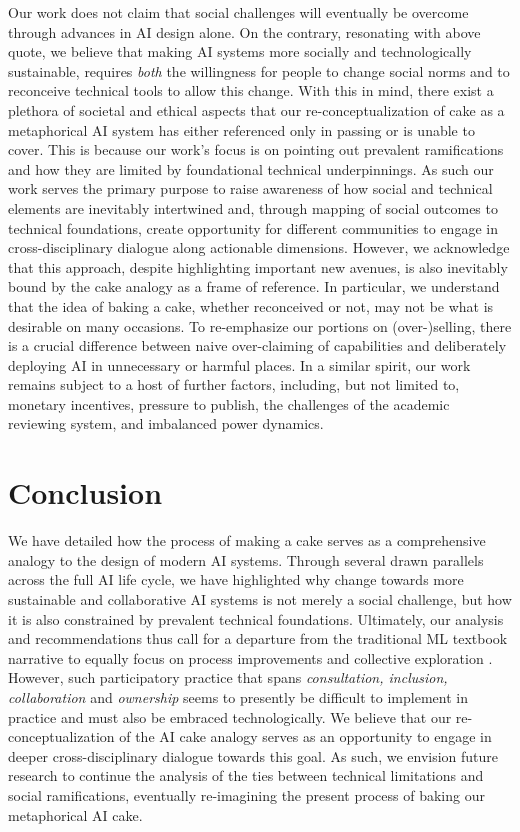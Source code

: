 \documentclass[manuscript,screen,authorversion,nonacm]{acmart}
\begin{document}
\noindent Our work does not claim that social challenges will eventually be overcome through advances in AI design alone. On the contrary, resonating with above quote, we believe that making AI systems more socially and technologically sustainable, requires \textit{both} the willingness for people to change social norms and to reconceive technical tools to allow this change. 
With this in mind, there exist a plethora of societal and ethical aspects that our re-conceptualization of cake as a metaphorical AI system has either referenced only in passing or is unable to cover. This is because our work's focus is on pointing out prevalent ramifications and how they are limited by foundational technical underpinnings. As such our work serves the primary purpose to raise awareness of how social and technical elements are inevitably intertwined and, through mapping of social outcomes to technical foundations, create opportunity for different communities to engage in cross-disciplinary dialogue along actionable dimensions. However, we acknowledge that this approach, despite highlighting important new avenues, is also inevitably bound by the cake analogy as a frame of reference. In particular, we understand that the idea of baking a cake, whether reconceived or not, may not be what is desirable on many occasions. To re-emphasize our portions on (over-)selling, there is a crucial difference between naive over-claiming of capabilities and deliberately deploying AI in unnecessary or harmful places.
In a similar spirit, our work remains subject to a host of further factors, including, but not limited to, monetary incentives, pressure to publish, the challenges of the academic reviewing system, and imbalanced power dynamics. 

\section{Conclusion}
We have detailed how the process of making a cake serves as a comprehensive analogy to the design of modern AI systems. Through several drawn parallels across the full AI life cycle, we have highlighted why change towards more sustainable and collaborative AI systems is not merely a social challenge, but how it is also constrained by prevalent technical foundations. Ultimately, our analysis and recommendations thus call for a departure from the traditional ML textbook narrative \cite{Bishop2006MLBook,Murphy2012ProbMLBook,Goodfellow2016DLBook} to equally focus on process improvements and collective exploration \cite{Birhane2022powertopeople}. However, such participatory practice \cite{Arnstein1969ladder} that spans \emph{consultation, inclusion, collaboration} and \emph{ownership} seems to presently be difficult to implement in practice \cite{Delgado2023participatoryturn, AdaLoveInst2021ParticipatoryDataSteward} and must also be embraced technologically. We believe that our re-conceptualization of the AI cake analogy serves as an opportunity to engage in deeper cross-disciplinary dialogue towards this goal. As such, we envision future research to continue the analysis of the ties between technical limitations and social ramifications, eventually re-imagining the present process of baking our metaphorical AI cake. 
\clearpage




\end{document}
